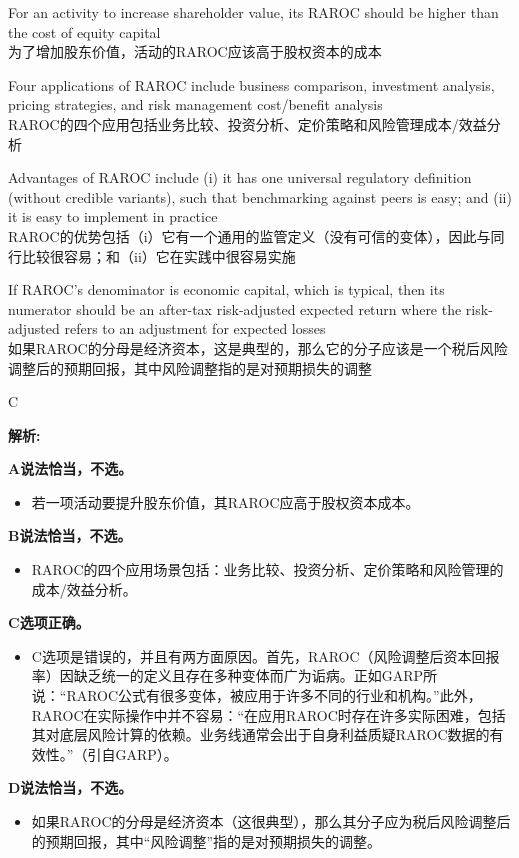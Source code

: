 \documentclass{article}
\newenvironment{explanation}
{\textbf{解析:}\par}
{\par}
\begin{document}
\begin{choices}
    \item For an activity to increase shareholder value, its RAROC should be higher than the cost of equity capital
    \\为了增加股东价值，活动的RAROC应该高于股权资本的成本
    \item Four applications of RAROC include business comparison, investment analysis, pricing strategies, and risk management cost/benefit analysis
    \\RAROC的四个应用包括业务比较、投资分析、定价策略和风险管理成本/效益分析
    \item Advantages of RAROC include (i) it has one universal regulatory definition (without credible variants), such that benchmarking against peers is easy; and (ii) it is easy to implement in practice
    \\RAROC的优势包括（i）它有一个通用的监管定义（没有可信的变体），因此与同行比较很容易；和（ii）它在实践中很容易实施
    \item If RAROC's denominator is economic capital, which is typical, then its numerator should be an after-tax risk-adjusted expected return where the risk-adjusted refers to an adjustment for expected losses
    \\如果RAROC的分母是经济资本，这是典型的，那么它的分子应该是一个税后风险调整后的预期回报，其中风险调整指的是对预期损失的调整
\end{choices}

\begin{correctanswer}
    C
\end{correctanswer}

\begin{explanation}
    \textbf{A说法恰当，不选。} 
    \begin{itemize}
        \item 若一项活动要提升股东价值，其RAROC应高于股权资本成本。
    \end{itemize}
    
    \textbf{B说法恰当，不选。} 
    \begin{itemize}
        \item RAROC的四个应用场景包括：业务比较、投资分析、定价策略和风险管理的成本/效益分析。
    \end{itemize}

    \textbf{C选项正确。} 
    \begin{itemize}
        \item C选项是错误的，并且有两方面原因。首先，RAROC（风险调整后资本回报率）因缺乏统一的定义且存在多种变体而广为诟病。正如GARP所说：“RAROC公式有很多变体，被应用于许多不同的行业和机构。”此外，RAROC在实际操作中并不容易：“在应用RAROC时存在许多实际困难，包括其对底层风险计算的依赖。业务线通常会出于自身利益质疑RAROC数据的有效性。”（引自GARP）。
    \end{itemize}

    \textbf{D说法恰当，不选。} 
    \begin{itemize}
        \item 如果RAROC的分母是经济资本（这很典型），那么其分子应为税后风险调整后的预期回报，其中“风险调整”指的是对预期损失的调整。
    \end{itemize}
\end{explanation}
\end{document}
